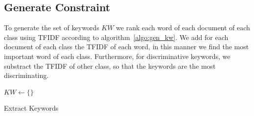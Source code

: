 \subsection{Generate Constraint}
To generate the set of keywords $KW$ we rank each word of each 
document of each class using TFIDF according to algorithm~\ref{algo:gen_kw}.
We add for each document of each class the TFIDF of each word, in this manner
we find the most important word of each class. Furthermore, for discriminative keywords,
we substract  the TFIDF of other class, so that the keywords are the most discriminating.
\begin{algorithm}
  $KW \gets \{\}$\\
  \caption{\label{algo:gen_kw}Extract Keywords}
\end{algorithm}
